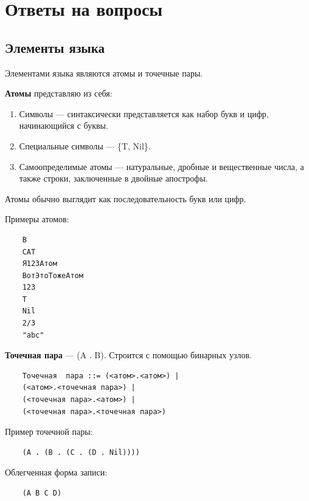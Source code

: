 \chapter{Ответы на вопросы}

\section{Элементы языка}

Элементами языка являются атомы и точечные пары.

\textbf{Атомы} представляю из себя:
\begin{enumerate}
	\item Символы --- синтаксически представляется как набор букв и цифр, начинающийся с буквы.
	\item Специальные символы --- \{T, Nil\}.
	\item Самоопределимые атомы --- натуральные, дробные и вещественные числа, а также строки, заключенные в двойные апострофы. 
\end{enumerate}

Атомы обычно выглядит как последовательность букв или цифр.

Примеры атомов:
\begin{lstlisting}
	B
	CAT
	Я123Атом
	ВотЭтоТожеАтом
	123
	T
	Nil
	2/3
	"abc"
\end{lstlisting}

\textbf{Точечная пара} --- (A . B). Строится с помощью бинарных узлов.   

\begin{lstlisting}
	Точечная  пара ::= (<атом>.<атом>) |
	(<атом>.<точечная пара>) |
	(<точечная пара>.<атом>) |
	(<точечная пара>.<точечная пара>)	
\end{lstlisting}

Пример точечной пары:
\begin{lstlisting}
	(A . (B . (C . (D . Nil))))
\end{lstlisting}
Облегченная форма записи:
\begin{lstlisting}
	(A B C D)
\end{lstlisting}

\begin{figure}[ht!]
\end{figure}

